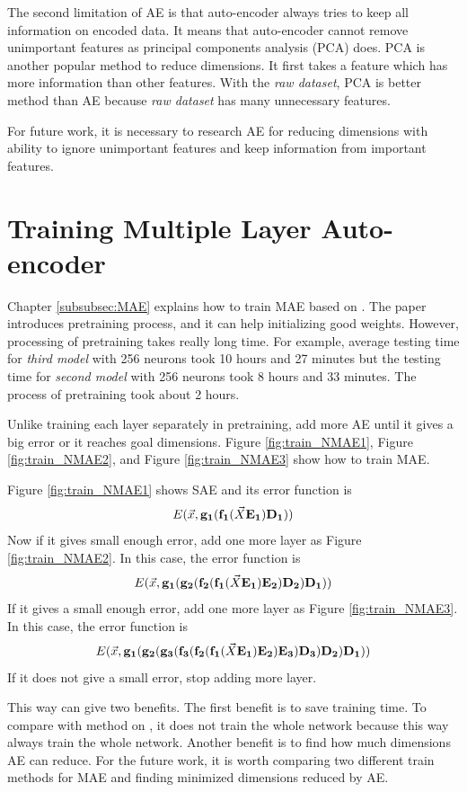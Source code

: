 \documentclass[draft,dvipsnames]{drexel-thesis}
\begin{document}
\begin{thesis}
The second limitation of AE is that auto-encoder always tries to keep all information on encoded data. It means that auto-encoder cannot remove unimportant features as principal components analysis (PCA) does. PCA is another popular method to reduce dimensions. It first takes a feature which has more information than other features. With the {\em raw dataset}, PCA is better method than AE because {\em raw dataset} has many unnecessary features.

For future work, it is necessary to research AE for reducing dimensions with ability to ignore unimportant features and keep information from important features.

\section{Training Multiple Layer Auto-encoder}
Chapter \ref{subsubsec:MAE} explains how to train MAE based on \cite{hinton2006reducing}. The paper introduces pretraining process, and it can help initializing good weights. However, processing of pretraining takes really long time. For example, average testing time for {\em third model} with 256 neurons took 10 hours and 27 minutes but the testing time for {\em second model} with 256 neurons took 8 hours and 33 minutes. The process of pretraining took about 2 hours.

Unlike training each layer separately in pretraining, add more AE until it gives a big error or it reaches goal dimensions. Figure \ref{fig:train_NMAE1}, Figure \ref{fig:train_NMAE2}, and Figure \ref{fig:train_NMAE3} show how to train MAE.

	Figure \ref{fig:train_NMAE1} shows SAE and its error function is
$$E(\vec{x}, \bold{g_1}(\bold{f_1}(\vec{X}\bold{E_1})\bold{D_1}))$$
Now if it gives small enough error, add one more layer as Figure \ref{fig:train_NMAE2}. In this case, the error function is
$$E(\vec{x}, \bold{g_1}(\bold{g_2}(\bold{f_2}(\bold{f_1}(\vec{X}\bold{E_1})\bold{E_2})\bold{D_2})\bold{D_1}))$$
If it gives a small enough error, add one more layer as Figure \ref{fig:train_NMAE3}. In this case, the error function is
$$E(\vec{x}, \bold{g_1}(\bold{g_2}(\bold{g_3}(\bold{f_3}(\bold{f_2}(\bold{f_1}(\vec{X}\bold{E_1})\bold{E_2})\bold{E_3})\bold{D_3})\bold{D_2})\bold{D_1}))$$
If it does not give a small error, stop adding more layer.

This way can give two benefits. The first benefit is to save training time. To compare with method on \cite{hinton2006reducing}, it does not train the whole network because this way always train the whole network. Another benefit is to find how much dimensions AE can reduce. For the future work, it is worth comparing two different train methods for MAE and finding minimized dimensions reduced by AE.


\end{thesis}
\end{document}
